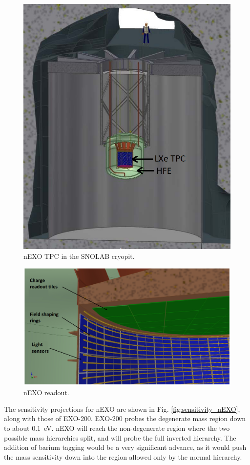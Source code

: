 \begin{figure} %
	\centering
	\includegraphics[width=.7\textwidth]{figures/nEXO_cryopit.png}
	\caption{nEXO TPC in the SNOLAB cryopit.}
\label{fig:nEXO_cryopit}
\end{figure}

\begin{figure} %
	\centering
	\includegraphics[width=.7\textwidth]{figures/nEXO_readout.png}
	\caption{nEXO readout.}
\label{fig:nEXO_readout}
\end{figure}

The sensitivity projections for nEXO are shown in Fig. \ref{fig:sensitivity_nEXO}, along with those of EXO-200.  EXO-200 probes the degenerate mass region down to about 0.1~eV.  nEXO will reach the non-degenerate region where the two possible mass hierarchies split, and will probe the full inverted hierarchy.  The addition of barium tagging would be a very significant advance, as it would push the mass sensitivity down into the region allowed only by the normal hierarchy.


